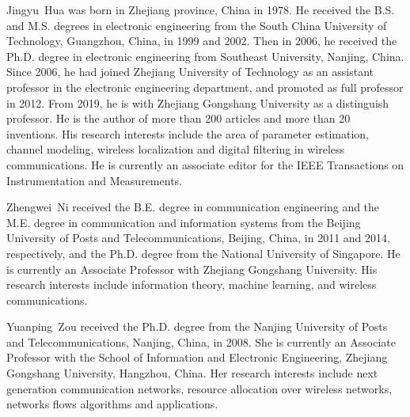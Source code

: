 \documentclass[journal]{IEEEtran}
\begin{document}
   \begin{IEEEbiography}
   				                                          {Jingyu~Hua}
   was born in
   Zhejiang province, China in 1978. He received the
   B.S. and M.S. degrees in electronic engineering
   from the South China University of Technology,
   Guangzhou, China, in 1999 and 2002. Then in
   2006, he received the Ph.D. degree in electronic
   engineering from Southeast University, Nanjing,
   China. Since 2006, he had joined Zhejiang University of Technology as an assistant professor in the
   electronic engineering department, and promoted
   as full professor in 2012. From 2019, he is with Zhejiang Gongshang
   University as a distinguish professor. He is the author of more than 200
   articles and more than 20 inventions. His research interests include the area
   of parameter estimation, channel modeling, wireless localization and digital
   filtering in wireless communications. He is currently an associate editor for
   the IEEE Transactions on Instrumentation and Measurements.
   \end{IEEEbiography}
   
   
   
   \begin{IEEEbiography}
                  {Zhengwei~Ni}
   received the B.E. degree in communication engineering and the
   M.E. degree in communication and information
   systems from the Beijing University of Posts and
   Telecommunications, Beijing, China, in 2011 and
   2014, respectively, and the Ph.D. degree from
   the National University of Singapore. He is currently an Associate Professor with Zhejiang Gongshang University. His research interests include
   information theory, machine learning, and wireless communications.
   \end{IEEEbiography}
   

   
   \begin{IEEEbiography}
  {Yuanping~Zou}
   received the Ph.D. degree from the Nanjing University of Posts and Telecommunications, Nanjing, China, in 2008.
   She is currently an Associate Professor with
   the School of Information and Electronic Engineering, Zhejiang Gongshang University, Hangzhou, China.
   Her research interests include next generation communication networks, resource allocation over wireless networks, networks flows algorithms and applications.
   \end{IEEEbiography}
\end{document}

